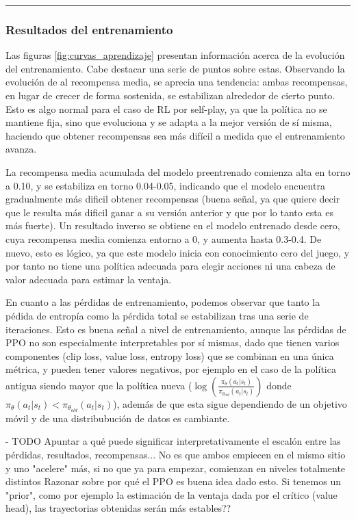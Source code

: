 \documentclass[12pt, a4paper]{article}
\begin{document}
\rule{\textwidth}{0.2pt}
\subsubsection{Resultados del entrenamiento}

Las figuras \ref{fig:curvas_aprendizaje} presentan información acerca de la evolución del entrenamiento.
Cabe destacar una serie de puntos sobre estas. Observando la evolución de al recompensa media, se aprecia una tendencia: ambas recompensas, en lugar de crecer de forma sostenida, se estabilizan alrededor de cierto punto. Esto es algo normal para el caso de RL por self-play, ya que la política no se mantiene fija, sino que evoluciona y se adapta a la mejor versión de sí misma, haciendo que obtener recompensas sea más difícil a medida que el entrenamiento avanza. 

La recompensa media acumulada del modelo preentrenado comienza alta en torno a 0.10, y se estabiliza en torno 0.04-0.05, indicando que el modelo encuentra gradualmente más dificil obtener recompensas (buena señal, ya que quiere decir que le resulta más dificil ganar a su versión anterior y que por lo tanto esta es más fuerte). Un resultado inverso se obtiene en el modelo entrenado desde cero, cuya recompensa media comienza entorno a 0, y aumenta hasta 0.3-0.4. De nuevo, esto es lógico, ya que este modelo inicia con conocimiento cero del juego, y por tanto no tiene una política adecuada para elegir acciones ni una cabeza de valor adecuada para estimar la ventaja.

En cuanto a las pérdidas de entrenamiento, podemos observar que tanto la pédida de entropía como la pérdida total se estabilizan tras una serie de iteraciones. Esto es buena señal a nivel de entrenamiento, aunque las pérdidas de PPO no son especialmente interpretables por sí mismas, dado que tienen varios componentes (clip loss, value loss, entropy loss) que se combinan en una única métrica, y pueden tener valores negativos, por ejemplo en el caso de la política antigua siendo mayor que la política nueva ($\log({\frac{\pi_\theta(a_t|s_t)}{\pi_{\theta_{old}}(a_t|s_t)}})$ donde $\pi_\theta(a_t|s_t) < \pi_{\theta_{old}}(a_t|s_t)$), además de que esta sigue dependiendo de un objetivo móvil y de una distribubución de datos es cambiante. 

- TODO Apuntar a qué puede significar interpretativamente el escalón entre las pérdidas, resultados, recompensas... No es que ambos empiecen en el mismo sitio y uno "acelere" más, si no que ya para empezar, comienzan en niveles totalmente distintos
Razonar sobre por qué el PPO es buena idea dado esto. Si tenemos un "prior", como por ejemplo la estimación de la ventaja dada por el crítico (value head), las trayectorias obtenidas serán más estables??
\end{document}
